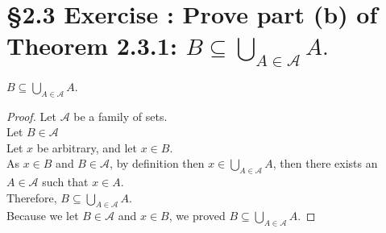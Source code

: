 \documentclass[a4paper,11pt]{article}
\begin{document}
\section*{\S 2.3 Exercise : Prove part (b) of Theorem 2.3.1: \(B \subseteq \bigcup\limits_{A\in\mathscr{A}}A.\)}
\begin{theorem1}
\(B \subseteq \bigcup\limits_{A\in\mathscr{A}}A.\)
\begin{proof}
  Let \(\mathscr{A}\) be a family of sets.\\
  Let \(B \in \mathscr{A}\)\\
  Let \(x\) be arbitrary, and let \(x \in B\).\\
  As \(x \in B\) and \(B \in \mathscr{A}\), by definition then \(x \in \bigcup\limits_{A\in\mathscr{A}}A\), then there exists an \(A \in \mathscr{A}\) such that \(x \in A\).\\
  Therefore, \(B \subseteq \bigcup\limits_{A\in\mathscr{A}}A\).\\
  Because we let \(B \in \mathscr{A}\) and \(x \in B\), we proved \(B \subseteq \bigcup\limits_{A\in\mathscr{A}}A\).
\end{proof}
\end{theorem1}

\newpage

\setcounter{ProblemCounter}{4}
\setcounter{SubsectionCounter}{1}
\end{document}
